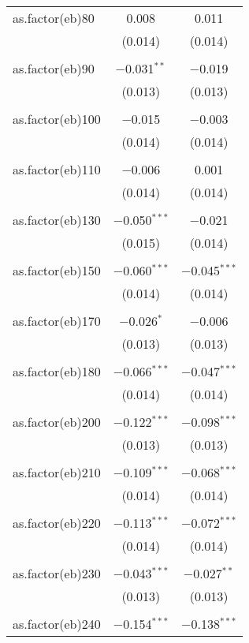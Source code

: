 \begin{table}[!htbp]
\begin{tabular}{@{\extracolsep{5pt}}lcc}
 as.factor(eb)80 & 0.008 & 0.011 \\ 
  & (0.014) & (0.014) \\ 
  & & \\ 
 as.factor(eb)90 & $-$0.031$^{**}$ & $-$0.019 \\ 
  & (0.013) & (0.013) \\ 
  & & \\ 
 as.factor(eb)100 & $-$0.015 & $-$0.003 \\ 
  & (0.014) & (0.014) \\ 
  & & \\ 
 as.factor(eb)110 & $-$0.006 & 0.001 \\ 
  & (0.014) & (0.014) \\ 
  & & \\ 
 as.factor(eb)130 & $-$0.050$^{***}$ & $-$0.021 \\ 
  & (0.015) & (0.014) \\ 
  & & \\ 
 as.factor(eb)150 & $-$0.060$^{***}$ & $-$0.045$^{***}$ \\ 
  & (0.014) & (0.014) \\ 
  & & \\ 
 as.factor(eb)170 & $-$0.026$^{*}$ & $-$0.006 \\ 
  & (0.013) & (0.013) \\ 
  & & \\ 
 as.factor(eb)180 & $-$0.066$^{***}$ & $-$0.047$^{***}$ \\ 
  & (0.014) & (0.014) \\ 
  & & \\ 
 as.factor(eb)200 & $-$0.122$^{***}$ & $-$0.098$^{***}$ \\ 
  & (0.013) & (0.013) \\ 
  & & \\ 
 as.factor(eb)210 & $-$0.109$^{***}$ & $-$0.068$^{***}$ \\ 
  & (0.014) & (0.014) \\ 
  & & \\ 
 as.factor(eb)220 & $-$0.113$^{***}$ & $-$0.072$^{***}$ \\ 
  & (0.014) & (0.014) \\ 
  & & \\ 
 as.factor(eb)230 & $-$0.043$^{***}$ & $-$0.027$^{**}$ \\ 
  & (0.013) & (0.013) \\ 
  & & \\ 
 as.factor(eb)240 & $-$0.154$^{***}$ & $-$0.138$^{***}$ \\ 

\end{tabular}
\end{table}
